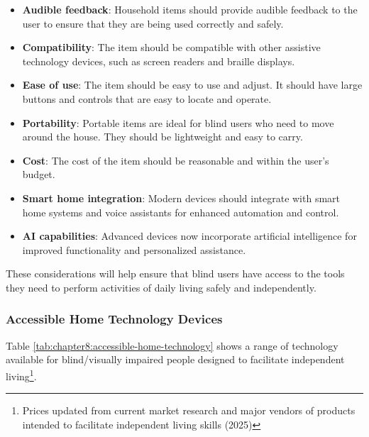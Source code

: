 \begin{itemize}

 \item \textbf{Audible feedback}: Household items should provide audible feedback to the user to ensure that they are being used correctly and safely.
 \item \textbf{Compatibility}: The item should be compatible with other assistive technology devices, such as screen readers and braille displays.
 \item \textbf{Ease of use}: The item should be easy to use and adjust. It should have large buttons and controls that are easy to locate and operate.
 \item \textbf{Portability}: Portable items are ideal for blind users who need to move around the house. They should be lightweight and easy to carry.
 \item \textbf{Cost}: The cost of the item should be reasonable and within the user's budget.
 \item \textbf{Smart home integration}: Modern devices should integrate with smart home systems and voice assistants for enhanced automation and control.
 \item \textbf{AI capabilities}: Advanced devices now incorporate artificial intelligence for improved functionality and personalized assistance.

\end{itemize}

These considerations will help ensure that blind users have access to the tools they need to perform activities of daily living safely and independently.

\subsubsection{Accessible Home Technology Devices}

Table \ref{tab:chapter8:accessible-home-technology} shows a range of technology available for blind/visually impaired people designed to facilitate independent living\footnote{Prices updated from current market research and major vendors of products intended to facilitate independent living skills (2025)}.

